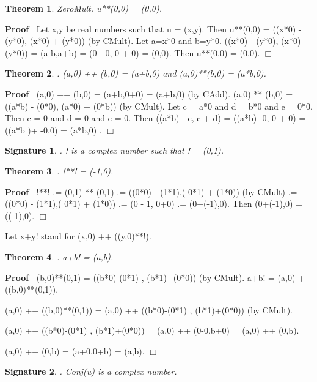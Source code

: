 \documentclass{article}
\newenvironment{forthel}{\begin{leftbar}}{\end{leftbar}}
\newenvironment{proof}{\noindent\textbf{Proof\ }}{\hspace*{\fill}$\Box$\medskip}
\newtheorem{theorem}{Theorem}
\newtheorem{signature}{Signature}
\begin{document}
\begin{forthel}
\begin{theorem}
 ZeroMult. u**(0,0) = (0,0).
\end{theorem}\begin{proof}
 Let x,y be real numbers such that u = (x,y). Then u**(0,0) = ((x*0) - (y*0), (x*0) + (y*0)) (by CMult). 
Let a=x*0 and b=y*0.
((x*0) - (y*0), (x*0) + (y*0)) = (a-b,a+b) = (0 - 0, 0 + 0) = (0,0). 
Then u**(0,0) = (0,0). 
\end{proof}


\begin{theorem}
. (a,0) ++ (b,0) = (a+b,0) and (a,0)**(b,0) = (a*b,0).
\end{theorem}\begin{proof}
 	(a,0) ++ (b,0) = (a+b,0+0) = (a+b,0) (by CAdd).
(a,0) ** (b,0) = ((a*b) - (0*0), (a*0) + (0*b)) (by CMult).
Let c = a*0 and d = b*0 and e = 0*0.
Then c = 0 and d = 0 and e = 0.
Then ((a*b) - e, c + d) = ((a*b) -0, 0 + 0) = ((a*b )+ -0,0) = (a*b,0) . \end{proof}


\begin{signature}. ! is a complex number such that ! = (0,1).

\end{signature}

\begin{theorem}
. !**! = (-1,0).
\end{theorem}\begin{proof}
 	!**! .= (0,1) ** (0,1) 
.= ((0*0) - (1*1),( 0*1) + (1*0)) (by CMult)
.=((0*0) - (1*1),( 0*1) + (1*0)) 
.= (0 - 1, 0+0) 
.= (0+(-1),0).
Then (0+(-1),0) = ((-1),0). 
\end{proof}


Let x+y! stand for (x,0) ++ ((y,0)**!).


\begin{theorem}
. a+b! = (a,b).
\end{theorem}\begin{proof}
 	(b,0)**(0,1) = ((b*0)-(0*1) , (b*1)+(0*0)) (by CMult).
a+b! = (a,0) ++ ((b,0)**(0,1)). 

(a,0) ++ ((b,0)**(0,1))
= (a,0) ++ ((b*0)-(0*1) , (b*1)+(0*0)) (by CMult).

(a,0) ++ ((b*0)-(0*1) , (b*1)+(0*0))
= (a,0) ++ (0-0,b+0) 
= (a,0) ++ (0,b).

(a,0) ++ (0,b)
= (a+0,0+b) 
= (a,b).
\end{proof}



\begin{signature}. Conj(u) is a complex number.


\end{signature}
\end{forthel}
\end{document}
